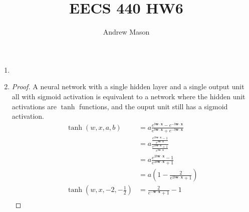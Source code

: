 \documentclass[12pt]{article}
\title{EECS 440 HW6}
\author{Andrew Mason}
\begin{document}
\maketitle

\begin{enumerate}
  \item
  \item
    \begin{proof} A neural network with a single hidden layer and a single
      output unit all with sigmoid activation is equivalent to a network where
      the hidden unit activations are $\tanh$ functions, and the ouput unit
      still has a sigmoid activation.\\

      \begin{equation}
        \begin{split}
          \tanh(w,x,a,b)&=a\frac{e^{b\boldsymbol{w}\cdot \boldsymbol{x}}-
                                 e^{-b\boldsymbol{w}\cdot\boldsymbol{x}}}
                                {e^{b\boldsymbol{w}\cdot\boldsymbol{x}}+
                                 e^{-b\boldsymbol{w}\cdot\boldsymbol{x}}}\\
          &=a\frac{\frac{e^{2b\boldsymbol{w}\cdot \boldsymbol{x}}-1}
                   {e^{b\boldsymbol{w}\cdot\boldsymbol{x}}}}
                  {\frac{e^{2b\boldsymbol{w}\cdot\boldsymbol{x}}+1}
                   {e^{b\boldsymbol{w}\cdot\boldsymbol{x}}}}\\
          &=a\frac{e^{2b\boldsymbol{w}\cdot \boldsymbol{x}}-1}
                  {e^{2b\boldsymbol{w}\cdot\boldsymbol{x}}+1}\\
          &=a\left(1-\frac{2}
                         {e^{2b\boldsymbol{w}\cdot\boldsymbol{x}}+1}\right)\\
          \tanh(w,x,-2,-\frac{1}{2})&=
            \frac{2}
                 {e^{-\boldsymbol{w}\cdot\boldsymbol{x}}+1}-1\\
        \end{split}
      \end{equation}


\end{proof}
\end{enumerate}
\end{document}
